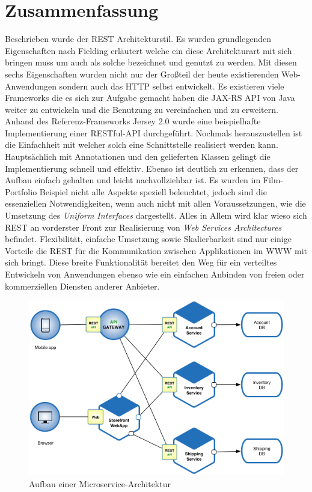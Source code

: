\documentclass[fleqn,10.5pt,ngerman]{SelfArx}
\begin{document}
\section{Zusammenfassung}
Beschrieben wurde der REST Architekturstil. Es wurden grundlegenden Eigenschaften nach Fielding erläutert welche ein diese Architekturart mit sich bringen muss um auch als solche bezeichnet und genutzt zu werden. Mit diesen sechs Eigenschaften wurden nicht nur der Großteil der heute existierenden Web-Anwendungen sondern auch das HTTP selbst entwickelt. Es existieren viele Frameworks die es sich zur Aufgabe gemacht haben die JAX-RS API von Java weiter zu entwickeln und die Benutzung zu vereinfachen und zu erweitern. Anhand des Referenz-Frameworks Jersey 2.0 wurde eine beispielhafte Implementierung einer RESTful-API durchgeführt. Nochmals herauszustellen ist die Einfachheit mit welcher solch eine Schnittstelle realisiert werden kann. Hauptsächlich mit Annotationen und den gelieferten Klassen gelingt die Implementierung schnell und effektiv. Ebenso ist deutlich zu erkennen, dass der Aufbau einfach gehalten und leicht nachvollziehbar ist. Es wurden im Film-Portfolio Beispiel nicht alle Aspekte speziell beleuchtet, jedoch sind die essenziellen Notwendigkeiten, wenn auch nicht mit allen Voraussetzungen, wie die Umsetzung des \textit{Uniform Interfaces} dargestellt. Alles in Allem wird klar wieso sich REST an vorderster Front zur Realisierung von \textit{Web Services Architectures} befindet. Flexibilität, einfache Umsetzung sowie Skalierbarkeit sind nur einige Vorteile die REST für die Kommunikation zwischen Applikationen im WWW mit sich bringt. Diese breite Funktionalität bereitet den Weg für ein verteiltes Entwickeln von Anwendungen ebenso wie ein einfachen Anbinden von freien oder kommerziellen Diensten anderer Anbieter.
\begin{figure}[ht]\centering
	\includegraphics[width=8.5 cm]{Abbildungen/Microservice_Architecture.png}
	\caption{Aufbau einer Microservice-Architektur}
	\label{fig:micro}
\end{figure}
\end{document}

